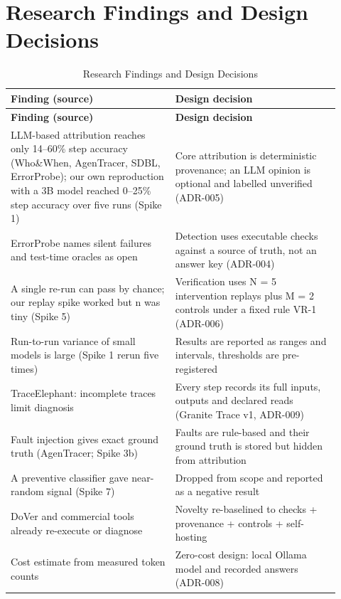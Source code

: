 \documentclass{fast-nuces-bs}
\begin{document}
\section{Research Findings and Design Decisions}

{\small
\begin{longtable}{>{\raggedright\arraybackslash\hspace{0pt}}p{0.460\linewidth}>{\raggedright\arraybackslash\hspace{0pt}}p{0.460\linewidth}}
\caption{Research Findings and Design Decisions}\label{tab:chapter2_research-3}\\
\toprule
\textbf{Finding (source)} & \textbf{Design decision} \\
\midrule
\endfirsthead
\toprule
\textbf{Finding (source)} & \textbf{Design decision} \\
\midrule
\endhead
\bottomrule
\endlastfoot
LLM-based attribution reaches only 14--60\% step accuracy (Who\&When, AgenTracer, SDBL, ErrorProbe); our own reproduction with a 3B model reached 0--25\% step accuracy over five runs (Spike 1) & Core attribution is deterministic provenance; an LLM opinion is optional and labelled unverified (ADR-005) \\
ErrorProbe names silent failures and test-time oracles as open & Detection uses executable checks against a source of truth, not an answer key (ADR-004) \\
A single re-run can pass by chance; our replay spike worked but n was tiny (Spike 5) & Verification uses N = 5 intervention replays plus M = 2 controls under a fixed rule VR-1 (ADR-006) \\
Run-to-run variance of small models is large (Spike 1 rerun five times) & Results are reported as ranges and intervals, thresholds are pre-registered \\
TraceElephant: incomplete traces limit diagnosis & Every step records its full inputs, outputs and declared reads (Granite Trace v1, ADR-009) \\
Fault injection gives exact ground truth (AgenTracer; Spike 3b) & Faults are rule-based and their ground truth is stored but hidden from attribution \\
A preventive classifier gave near-random signal (Spike 7) & Dropped from scope and reported as a negative result \\
DoVer and commercial tools already re-execute or diagnose & Novelty re-baselined to checks + provenance + controls + self-hosting \\
Cost estimate from measured token counts & Zero-cost design: local Ollama model and recorded answers (ADR-008) \\
\end{longtable}
}
\end{document}
